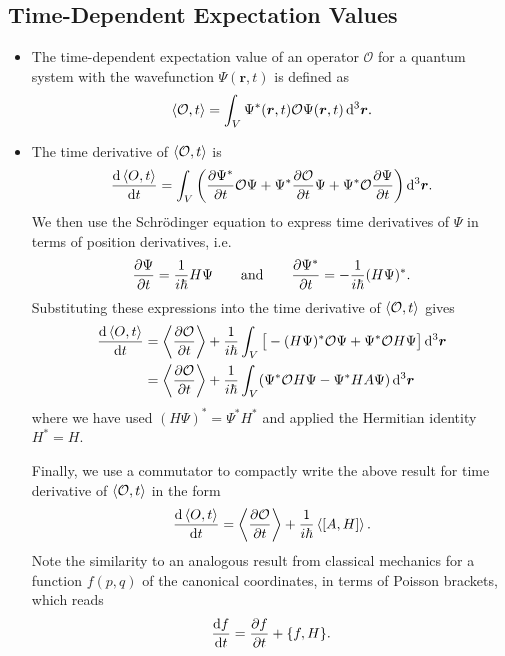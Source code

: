 \documentclass[11pt, a4paper]{article}
\newcommand{\diff}{\mathop{}\!\mathrm{d}} %
\newcommand{\dr}{\diff^{3} \r}  %
\newcommand{\eqtext}[1]{\qquad \text{#1} \qquad}
\newcommand{\Schro}{Schr\"{o}dinger\xspace}
\renewcommand{\vec}[1]{\bm{#1}} %
\renewcommand{\r}{\vec{r}}  %
\renewcommand{\O}{\mathcal{O}}  %
\renewcommand{\P}{\Psi}  %
\begin{document}
\subsection{Time-Dependent Expectation Values}
\begin{itemize}
	\item The time-dependent expectation value of an operator $ \O $ for a quantum system with the wavefunction $ \P(\r, t) $ is defined as
	\begin{equation*}
		\ev{\O, t} = \int_{V} \P^{*}(\r, t) \O \P(\r, t) \dr.
	\end{equation*}
	
	\item The time derivative of $ \ev{\O, t} $ is
	\begin{equation*}
		\dv{\ev{O, t}}{t} = \int_{V} \left(\pdv{\P^{*}}{t} \O \P + \P^{*}\pdv{\O}{t}\P + \P^{*}\O \pdv{\P}{t}\right) \dr.
	\end{equation*}
	We then use the \Schro equation to express time derivatives of $ \P $ in terms of position derivatives, i.e.
	\begin{equation*}
		\pdv{\P}{t} = \frac{1}{i\hbar}H \P \eqtext{and} \pdv{\P^{*}}{t} = -\frac{1}{i\hbar}(H \P)^{*}.
	\end{equation*}
	Substituting these expressions into the time derivative of $ \ev{\O, t} $ gives
	\begin{align*}
		\dv{\ev{O, t}}{t} &= \ev{\pdv{\O}{t}} + \frac{1}{i \hbar} \int_{V} \big[- (H\P)^{*}\O \P + \P^{*}\O H \P \big] \dr\\
		& = \ev{\pdv{\O}{t}} + \frac{1}{i \hbar} \int_{V} (\P^{*}\O H \P - \P^{*}H A \P) \dr
	\end{align*}
	where we have used $ (H \P)^{*} = \P^{*}H^{*} $ and applied the Hermitian identity $ H^{*} = H $. 
	
	Finally, we use a commutator to compactly write the above result for time derivative of $ \ev{\O, t} $ in the form
	\begin{equation*}
		\dv{\ev{O, t}}{t} =  \ev{\pdv{\O}{t}} + \frac{1}{i\hbar}\ev{[A, H]}.
	\end{equation*}
	Note the similarity to an analogous result from classical mechanics for a function $ f(p, q) $ of the canonical coordinates, in terms of Poisson brackets, which reads 
	\begin{equation*}
		\dv{f}{t} = \pdv{f}{t} + \{f, H\}.
	\end{equation*}
\end{itemize}
\end{document}
